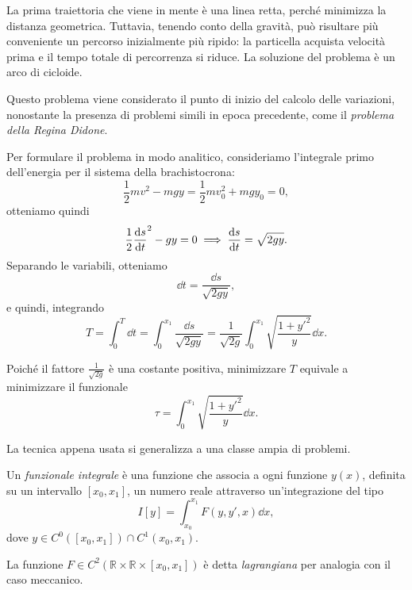 La prima traiettoria che viene in mente è una linea retta, perché minimizza la distanza geometrica. Tuttavia, tenendo conto della gravità, può risultare più conveniente un percorso inizialmente più ripido: la particella acquista velocità prima e il tempo totale di percorrenza si riduce. La soluzione del problema è un arco di cicloide.

Questo problema viene considerato il punto di inizio del calcolo delle variazioni, nonostante la presenza di problemi simili in epoca precedente, come il \emph{problema della Regina Didone}.

Per formulare il problema in modo analitico, consideriamo l'integrale primo dell'energia per il sistema della brachistocrona:
\begin{equation*}
    \frac{1}{2}mv^2 - mg y = \frac{1}{2}mv_0^2 + mg y_0 = 0,
\end{equation*}
otteniamo quindi
\begin{equation*}
    \frac{1}{2}\dv{s}{t}^2 - g y = 0 \implies \dv{s}{t} = \sqrt{2 g y}.
\end{equation*}
Separando le variabili, otteniamo
\begin{equation*}
    \dd{t} = \frac{\dd{s}}{\sqrt{2 g y}},
\end{equation*}
e quindi, integrando 
\begin{equation*}
    T = \int_0^T \dd{t} = \int_0^{x_1} \frac{\dd{s}}{\sqrt{2 g y}} = \frac{1}{\sqrt{2g}}\int_0^{x_1} \sqrt{\frac{1+y'^2}{y}}\dd{x}.
\end{equation*}

Poiché il fattore $\frac{1}{\sqrt{2g}}$ è una costante positiva, minimizzare $T$ equivale a minimizzare il funzionale
\begin{equation*}
    \tau = \int_0^{x_1} \sqrt{\frac{1+y'^2}{y}}\dd{x}.
\end{equation*}

La tecnica appena usata si generalizza a una classe ampia di problemi.

\begin{definition}
    Un \emph{funzionale integrale} è una funzione che associa a ogni funzione $y(x)$, definita su un intervallo $[x_0, x_1]$, un numero reale attraverso un'integrazione del tipo
    \begin{equation*}
        I[y] = \int_{x_0}^{x_1} F(y, y', x)\dd{x},
    \end{equation*}
    dove $y\in C^0([x_0, x_1])\cap C^1(x_0, x_1)$.

    La funzione $F\in C^2(\mathbb{R} \times \mathbb{R} \times [x_0, x_1])$ è detta \emph{lagrangiana} per analogia con il caso meccanico.
\end{definition}

